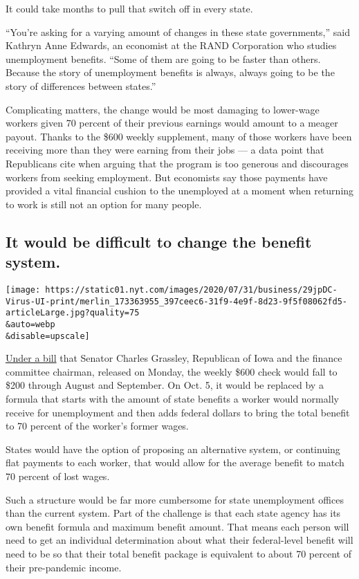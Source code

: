 It could take months to pull that switch off in every state.

``You're asking for a varying amount of changes in these state
governments,'' said Kathryn Anne Edwards, an economist at the RAND
Corporation who studies unemployment benefits. ``Some of them are going
to be faster than others. Because the story of unemployment benefits is
always, always going to be the story of differences between states.''

Complicating matters, the change would be most damaging to lower-wage
workers given 70 percent of their previous earnings would amount to a
meager payout. Thanks to the \$600 weekly supplement, many of those
workers have been receiving more than they were earning from their jobs
--- a data point that Republicans cite when arguing that the program is
too generous and discourages workers from seeking employment. But
economists say those payments have provided a vital financial cushion to
the unemployed at a moment when returning to work is still not an option
for many people.

\hypertarget{it-would-be-difficult-to-change-the-benefit-system}{%
\subsection{It would be difficult to change the benefit
system.}\label{it-would-be-difficult-to-change-the-benefit-system}}

\texttt{[image: https://static01.nyt.com/images/2020/07/31/business/29jpDC-Virus-UI-print/merlin\_173363955\_397ceec6-31f9-4e9f-8d23-9f5f08062fd5-articleLarge.jpg?quality=75\\\&auto=webp\\\&disable=upscale]}

\href{https://www.finance.senate.gov/imo/media/doc/SFC\%20CARES\%202.0\%20Legislative\%20Text.pdf}{Under
a bill} that Senator Charles Grassley, Republican of Iowa and the
finance committee chairman, released on Monday, the weekly \$600 check
would fall to \$200 through August and September. On Oct. 5, it would be
replaced by a formula that starts with the amount of state benefits a
worker would normally receive for unemployment and then adds federal
dollars to bring the total benefit to 70 percent of the worker's former
wages.

States would have the option of proposing an alternative system, or
continuing flat payments to each worker, that would allow for the
average benefit to match 70 percent of lost wages.

Such a structure would be far more cumbersome for state unemployment
offices than the current system. Part of the challenge is that each
state agency has its own benefit formula and maximum benefit amount.
That means each person will need to get an individual determination
about what their federal-level benefit will need to be so that their
total benefit package is equivalent to about 70 percent of their
pre-pandemic income.

